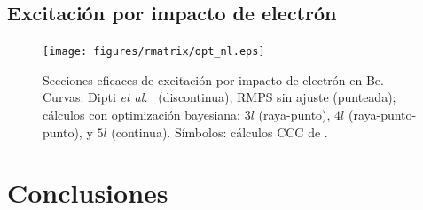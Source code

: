 \newpage
\subsection{Excitación por impacto de electrón}


\begin{figure}
\centering
\texttt{[image: figures/rmatrix/opt\_nl.eps]} 
\caption[Secciones eficaces de excitación por impacto de electrón en Be.]
{Secciones eficaces de excitación por impacto de electrón en Be.
Curvas: Dipti \textit{et al.}~\cite{Dipti:19} (discontinua), RMPS sin 
ajuste (punteada); cálculos con optimización bayesiana: 
$3l$ (raya-punto), 
$4l$ (raya-punto-punto), y
$5l$ (continua). 
Símbolos: cálculos CCC de \cite{Fursa:97}.}
\end{figure}

\newpage
\section{Conclusiones}
